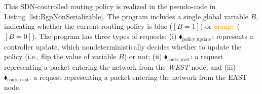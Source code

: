 %
This SDN-controlled routing policy is realized in the pseudo-code in Listing~\ref{lst:BgpNonSerializable}.
%
The program includes a single global variable $B$, indicating whether the current routing policy is \textcolor{NavyBlue}{blue} ($[B=1]$) or \textcolor{darkorange}{orange} ($[B=0]$).
%
The program has three types of requests:
%	
	(i)
	{\color{ForestGreen}$\blacklozenge_\text{policy update}$}:
 represents a controller  update, which nondeterministically decides whether to update the policy (i.e., flip the value of  variable $B$) or not;
%	
(ii)
	{\color{ForestGreen}$\blacklozenge_\text{route\_west}$}:
	 a request representing a packet entering the network from the \textit{WEST} node; and 
%	
(iii)
{\color{ForestGreen}$\blacklozenge_\text{route\_east}$}: a request representing a packet entering the network from the EAST node.
%


